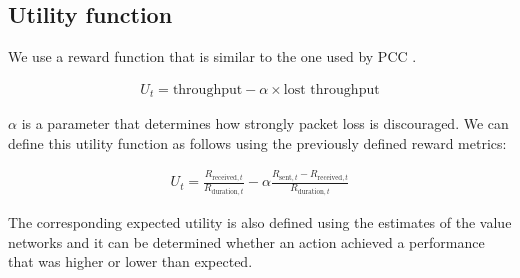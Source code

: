 \documentclass[newfonts=false,format=sigconf,10pt,letterpaper]{acmart}
\begin{document}
\subsection{Utility function}
\label{subsec:utility}


We use a reward function that is similar to the one used by PCC \cite{dong_pcc:_2015}.

\begin{align}
U_t = \text{throughput} - \alpha \times \text{lost throughput}
\end{align}

$\alpha$ is a parameter that determines how strongly packet loss is discouraged. We can define this utility function as follows using the previously defined reward metrics: 

\begin{align}
U_t = \frac{R_{\text{received},t}}{R_{\text{duration},t}} - \alpha \frac{R_{\text{sent},t} - R_{\text{received},t}}{R_{\text{duration},t}}
\end{align}

The corresponding expected utility is also defined using the estimates of the value networks and it can be determined whether an action achieved a performance that was higher or lower than expected. 

%
%
\end{document}
